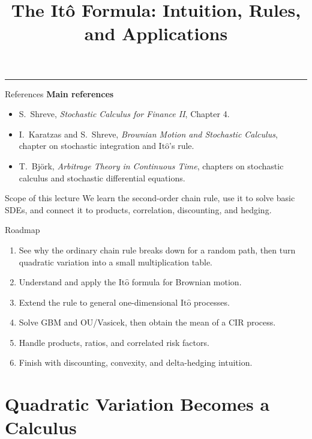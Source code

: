 \documentclass[handout,10pt,aspectratio=169]{beamer}
\title{The It\^o Formula: Intuition, Rules, and Applications}
\author{}
\date{}
\newcommand{\Ito}{\mathrm{It\hat{o}}}
\begin{document}
\begin{frame}[plain]
  \vfill
  {\inserttitle\par}
  \medskip
  {\color{BootcampBlueDark}\rule{0.95\textwidth}{0.8pt}}
  \vfill
\end{frame}

\begin{frame}{References}
\footnotesize
\textbf{Main references}
\begin{itemize}\setlength{\itemsep}{0.55em}
  \item S.~Shreve, \emph{Stochastic Calculus for Finance II}, Chapter 4.
  \item I.~Karatzas and S.~Shreve, \emph{Brownian Motion and Stochastic Calculus}, chapter on stochastic integration and \(\Ito\)'s rule.
  \item T.~Bj\"ork, \emph{Arbitrage Theory in Continuous Time}, chapters on stochastic calculus and stochastic differential equations.
\end{itemize}
\begin{block}{Scope of this lecture}
We learn the second-order chain rule, use it to solve basic SDEs, and connect it to products, correlation, discounting, and hedging.
\end{block}
\end{frame}

\begin{frame}{Roadmap}
\begin{enumerate}\setlength{\itemsep}{0.48em}
  \item See why the ordinary chain rule breaks down for a random path, then
        turn quadratic variation into a small multiplication table.
  \item Understand and apply the \(\Ito\) formula for Brownian motion.
  \item Extend the rule to general one-dimensional \(\Ito\) processes.
  \item Solve GBM and OU/Vasicek, then obtain the mean of a CIR process.
  \item Handle products, ratios, and correlated risk factors.
  \item Finish with discounting, convexity, and delta-hedging intuition.
\end{enumerate}
\end{frame}

\section{Quadratic Variation Becomes a Calculus}
\end{document}
